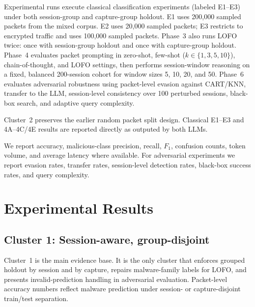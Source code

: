 \documentclass[conference]{IEEEtran}
\begin{document}
Experimental runs execute classical classification experiments (labeled E1--E3) under both session-group and capture-group holdout. E1 uses 200{,}000 sampled packets from the mixed corpus. E2 uses 20{,}000 sampled packets; E3 restricts to encrypted traffic and uses 100{,}000 sampled packets. Phase~3 also runs LOFO twice: once with session-group holdout and once with capture-group holdout. Phase~4 evaluates packet prompting in zero-shot, few-shot ($k \in \{1,3,5,10\}$), chain-of-thought, and LOFO settings, then performs session-window reasoning on a fixed, balanced 200-session cohort for window sizes 5, 10, 20, and 50. Phase~6 evaluates adversarial robustness using packet-level evasion against CART/KNN, transfer to the LLM, session-level consistency over 100 perturbed sessions, black-box search, and adaptive query complexity.

Cluster~2 preserves the earlier random packet split design. Classical E1--E3 and 4A--4C/4E results are reported directly as outputed by both LLMs.

We report accuracy, malicious-class precision, recall, $F_1$, confusion counts, token volume, and average latency where available. For adversarial experiments we report evasion rates, transfer rates, session-level detection rates, black-box success rates, and query complexity.


\section{Experimental Results}
\label{sec:results}

\subsection{Cluster 1: Session-aware, group-disjoint}

Cluster~1 is the main evidence base. It is the only cluster that enforces grouped holdout by session and by capture, repairs malware-family labels for LOFO, and presents invalid-prediction handling in adversarial evaluation. Packet-level accuracy numbers reflect malware prediction under session- or capture-disjoint train/test separation.
\end{document}
